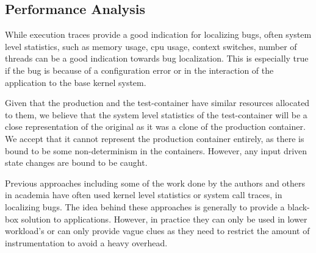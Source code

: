 \subsection{Performance Analysis}
\label{sec:Performance}

While execution traces provide a good indication for localizing bugs, often system level statistics, such as memory usage, cpu usage, context switches, number of threads can be a good indication towards bug localization.
This is especially true if the bug is because of a configuration error or in the interaction of the application to the base kernel system.

Given that the production and the test-container have similar resources allocated to them, we believe that the system level statistics of the test-container will be a close representation of the original as it was a clone of the production container.
We accept that it cannot represent the production container entirely, as there is bound to be some non-determinism in the containers.
However, any input driven state changes are bound to be caught.

Previous approaches including some of the work done by the authors \cite{clue} \cite{kscope} and others in academia \cite{sherlog} \cite{vscope} have often used kernel level statistics or system call traces, in localizing bugs. 
The idea behind these approaches is generally to provide a black-box solution to applications.
However, in practice they can only be used in lower workload's or can only provide vague clues as they need to restrict the amount of instrumentation to avoid a heavy overhead.


